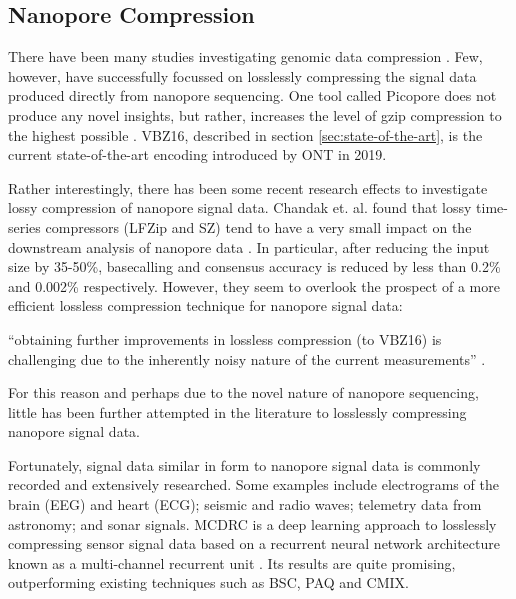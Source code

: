 \subsection{Nanopore Compression}

There have been many studies investigating genomic data compression \cite{genomic-comp}. Few, however, have successfully focussed on losslessly compressing the signal data produced directly from nanopore sequencing. One tool called Picopore does not produce any novel insights, but rather, increases the level of gzip compression to the highest possible \cite{picopore}. VBZ16, described in section \ref{sec:state-of-the-art}, is the current state-of-the-art encoding introduced by ONT in 2019.

Rather interestingly, there has been some recent research effects to investigate lossy compression of nanopore signal data. Chandak et. al. found that lossy time-series compressors (LFZip and SZ) tend to have a very small impact on the downstream analysis of nanopore data \cite{lossy-nano, lfzip}. In particular, after reducing the input size by 35-50\%, basecalling and consensus accuracy is reduced by less than 0.2\% and 0.002\% respectively. However, they seem to overlook the prospect of a more efficient lossless compression technique for nanopore signal data:
\begin{displayquote}
``obtaining further improvements in lossless compression (to VBZ16) is challenging due to the inherently noisy nature of the current measurements'' \cite{lossy-nano}.
\end{displayquote}
For this reason and perhaps due to the novel nature of nanopore sequencing, little has been further attempted in the literature to losslessly compressing nanopore signal data.

Fortunately, signal data similar in form to nanopore signal data is commonly recorded and extensively researched. Some examples include electrograms of the brain (EEG) and heart (ECG); seismic and radio waves; telemetry data from astronomy; and sonar signals. MCDRC is a deep learning approach to losslessly compressing sensor signal data based on a recurrent neural network architecture known as a multi-channel recurrent unit \cite{mcdrc}. Its results are quite promising, outperforming existing techniques such as BSC, PAQ and CMIX.
